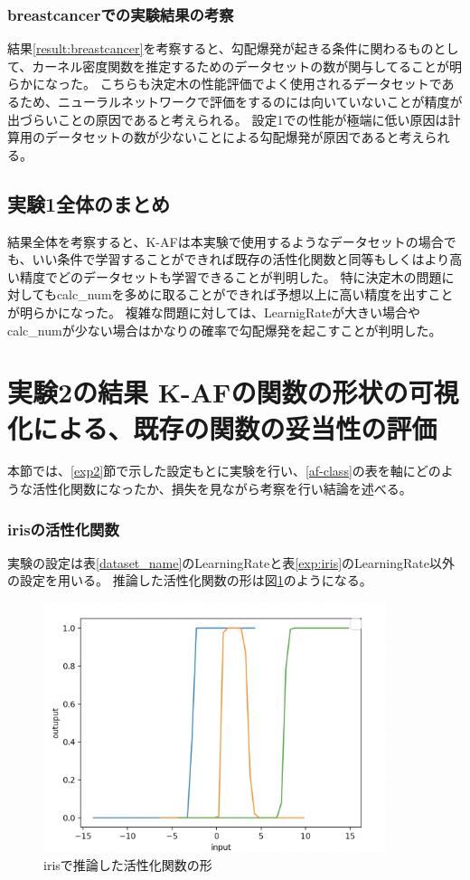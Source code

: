 \subsubsection{breastcancerでの実験結果の考察}
結果\ref{result:breastcancer}を考察すると、勾配爆発が起きる条件に関わるものとして、カーネル密度関数を推定するためのデータセットの数が関与してることが明らかになった。
こちらも決定木の性能評価でよく使用されるデータセットであるため、ニューラルネットワークで評価をするのには向いていないことが精度が出づらいことの原因であると考えられる。
設定1での性能が極端に低い原因は計算用のデータセットの数が少ないことによる勾配爆発が原因であると考えられる。

\subsection{実験1全体のまとめ}
結果全体を考察すると、K-AFは本実験で使用するようなデータセットの場合でも、いい条件で学習することができれば既存の活性化関数と同等もしくはより高い精度でどのデータセットも学習できることが判明した。
特に決定木の問題に対してもcalc\_numを多めに取ることができれば予想以上に高い精度を出すことが明らかになった。
複雑な問題に対しては、LearnigRateが大きい場合やcalc\_numが少ない場合はかなりの確率で勾配爆発を起こすことが判明した。


\section{実験2の結果 K-AFの関数の形状の可視化による、既存の関数の妥当性の評価}
\label{evo2}
本節では、\ref{exp2}節で示した設定もとに実験を行い、\ref{af-class}の表を軸にどのような活性化関数になったか、損失を見ながら考察を行い結論を述べる。





\subsubsection{irisの活性化関数}
\label{evo2:iris_result}
実験の設定は表\ref{dataset_name}のLearningRateと表\ref{exp:iris}のLearningRate以外の設定を用いる。
推論した活性化関数の形は図\ref{infer_iris}のようになる。
\begin{figure}[hbtp]
    \begin{center}
        \includegraphics[width=10cm]{asset/iris-0.1.png}
            \caption{irisで推論した活性化関数の形}
            \label{infer_iris}
    \end{center}
\end{figure}

